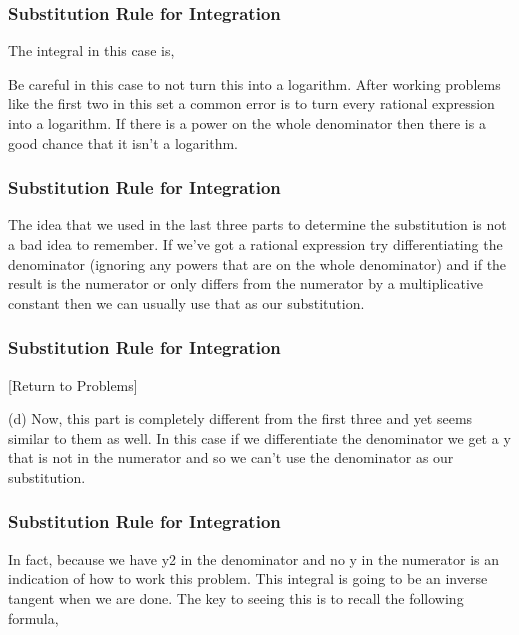 \documentclass{beamer}
\begin{document}
\begin{frame}
	\frametitle{Substitution Rule for Integration}
	\large
 
The integral in this case is,
                           
 
Be careful in this case to not turn this into a logarithm.  After working problems like the first two in this set a common error is to turn every rational expression into a logarithm.  If there is a power on the whole denominator then there is a good chance that it isn’t a logarithm.
\end{frame}
\begin{frame}
	\frametitle{Substitution Rule for Integration}
	\large
The idea that we used in the last three parts to determine the substitution is not a bad idea to remember.  If we’ve got a rational expression try differentiating the denominator (ignoring any powers that are on the whole denominator) and if the result is the numerator or only differs from the numerator by a multiplicative constant then we can usually use that as our substitution.
\end{frame}
\begin{frame}
	\frametitle{Substitution Rule for Integration}
	\large
[Return to Problems]
 
(d) 
Now, this part is completely different from the first three and yet seems similar to them as well.  In this case if we differentiate the denominator we get a y that is not in the numerator and so we can’t use the denominator as our substitution. 
\end{frame}
\begin{frame}
	\frametitle{Substitution Rule for Integration}
	\large
In fact, because we have y2 in the denominator and no y in the numerator is an indication of how to work this problem. This integral is going to be an inverse tangent when we are done.  The key to seeing this is to recall the following formula,
                                                      
 \end{frame}
\end{document}
